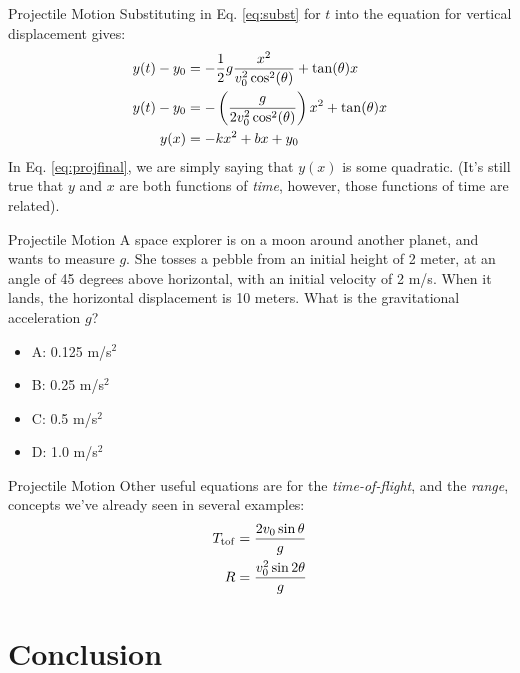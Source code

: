 \documentclass{beamer}
\begin{document}
\begin{frame}{Projectile Motion}
Substituting in Eq. \ref{eq:subst} for $t$ into the equation for vertical displacement gives:\\
\begin{align}
y(t) - y_{\rm 0} &= -\frac{1}{2}g\frac{x^2}{v_{\rm 0}^2\cos^2(\theta)} + \tan(\theta) x \\
y(t) - y_{\rm 0} &= -\left(\frac{g}{2v_{\rm 0}^2\cos^2(\theta)}\right)x^2 + \tan(\theta) x \\
y(x) &= -kx^2 + bx + y_{\rm 0}\label{eq:projfinal}
\end{align}
In Eq. \ref{eq:projfinal}, we are simply saying that $y(x)$ is some quadratic.  (It's still true that $y$ and $x$ are both functions of \textit{time}, however, those functions of time are related).
\end{frame}

\begin{frame}{Projectile Motion}
A space explorer is on a moon around another planet, and wants to measure $g$.  She tosses a pebble from an initial height of 2 meter, at an angle of 45 degrees above horizontal, with an initial velocity of 2 m/s.  When it lands, the horizontal displacement is 10 meters.  What is the gravitational acceleration $g$?
\begin{itemize}
\item A: 0.125 m/s$^2$
\item B: 0.25 m/s$^2$
\item C: 0.5 m/s$^2$
\item D: 1.0 m/s$^2$
\end{itemize}
\end{frame}

\begin{frame}{Projectile Motion}
Other useful equations are for the \textit{time-of-flight}, and the \textit{range}, concepts we've already seen in several examples: \\
\begin{align}
T_{\rm tof} &= \frac{2v_{\rm 0}\sin\theta}{g} \\
R &= \frac{v_{\rm 0}^2\sin2\theta}{g}
\end{align}
\end{frame}

\section{Conclusion}
\end{document}
